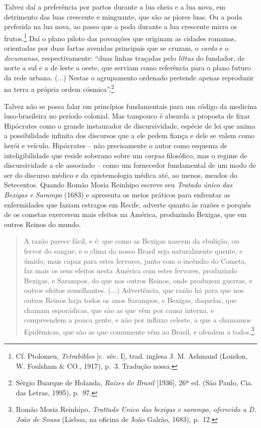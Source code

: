 Talvez daí a preferência por partos durante a lua cheia e a lua nova, em
detrimento das luas crescente e minguante, que são as piores luas. Ou a
poda preferida na lua nova, ao passo que a poda durante a lua crescente
mirra os frutos.\footnote{Cf. Ptolomeu, \emph{Tetrabiblos} {[}c.~séc.
  I{]}, trad. inglesa J. M. Ashmand (London, W. Foulsham \& CO., 1917),
  p.~3. Tradução nossa.} Daí o plano piloto das povoações que originam
as cidades romanas, orientadas por duas fartas avenidas principais que
se cruzam, o \emph{cardo} e o \emph{decumanus}, respectivamente: ``duas
linhas traçadas pelo \emph{littus} do fundador, de norte a sul e a de
leste a oeste, que serviam como referência para o plano futuro da rede
urbana. (...) Nestas o agrupamento ordenado pretende apenas reproduzir
na terra a própria ordem cósmica''.\footnote{Sérgio Buarque de Holanda,
  \emph{Raízes do Brasil} {[}1936{]}, 26ª ed. (São Paulo, Cia. das
  Letras, 1995), p.~97.}

Talvez não se possa falar em princípios fundamentais para um código da
medicina luso-brasileira no período colonial. Mas tampouco é absurda a
proposta de fixar Hipócrates como o grande instaurador de
discursividade, espécie de lei que anima a possibilidade infinita dos
discursos que a ele pedem fiança e dele se valem como herói e veículo.
Hipócrates -- não precisamente o autor como esquema de inteligibilidade
que reside soberano sobre um \emph{corpus} filosófico, mas o regime de
discursividade a ele associado -- como um fornecedor fundamental de um
modo de ser do discurso médico e da epistemologia médica até, ao menos,
meados do Setecentos. Quando Romão Mosia Reinhipo escreve seu
\emph{Tratado único das Bexigas e Sarampo} (1683) e apresenta os meios
práticos para enfrentar as enfermidades que faziam estragos em Recife,
adverte quanto às razões e porquês de os cometas exercerem mais efeitos
na América, produzindo Bexigas, que em outros Reinos do mundo.

\begin{quote}
A razão parece fácil, e é: que como as Bexigas nascem da ebulição, ou
fervor do sangue, e o clima do nosso Brasil seja naturalmente quente, e
úmido, mais capaz para estes fervores, junto com o incêndio do Cometa,
faz mais os seus efeitos nesta América com estes fervores, produzindo
Bexigas, e Sarampos, do que nos outros Reinos, onde produzem guerras, e
outros efeitos semelhantes. (...) Advertência, que razão há para que nos
outros Reinos haja todos os anos Sarampos, e Bexigas, daquelas, que
chamam esporádicas, que são as que vêm por causa interna, e compreendem
a pouca gente, e não por influxo celeste, a que a chamamos Epidêmicas,
que são as que comumente vêm ao Brasil, e ofendem a todos.\footnote{Romão
  Mosia Reinhipo, \emph{Trattado Unico das bexigas e sarampo, oferecido
  a D. João de Sousa} (Lisboa, na oficina de João Galrão, 1683), p.~12.}
\end{quote}

